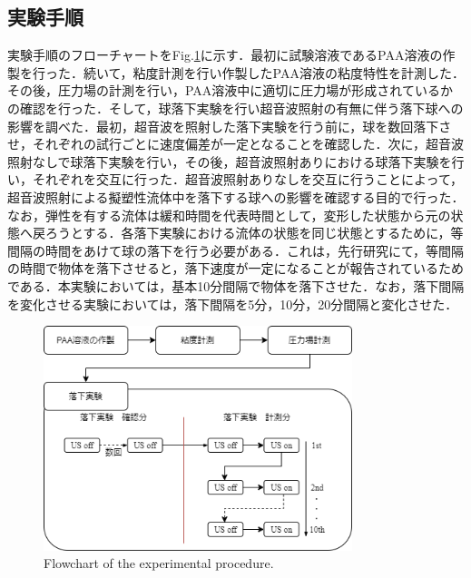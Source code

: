 \newpage

\subsection{実験手順}

実験手順のフローチャートをFig.\ref{fig:exp-methods}に示す．最初に試験溶液であるPAA溶液の作製を行った．続いて，粘度計測を行い作製したPAA溶液の粘度特性を計測した．その後，圧力場の計測を行い，PAA溶液中に適切に圧力場が形成されているかの確認を行った．そして，球落下実験を行い超音波照射の有無に伴う落下球への影響を調べた．最初，超音波を照射した落下実験を行う前に，球を数回落下させ，それぞれの試行ごとに速度偏差が一定となることを確認した．次に，超音波照射なしで球落下実験を行い，その後，超音波照射ありにおける球落下実験を行い，それぞれを交互に行った．超音波照射ありなしを交互に行うことによって，超音波照射による擬塑性流体中を落下する球への影響を確認する目的で行った．なお，弾性を有する流体は緩和時間を代表時間として，変形した状態から元の状態へ戻ろうとする．各落下実験における流体の状態を同じ状態とするために，等間隔の時間をあけて球の落下を行う必要がある．これは，先行研究\cite{ref:8-5}にて，等間隔の時間で物体を落下させると，落下速度が一定になることが報告されているためである．本実験においては，基本10分間隔で物体を落下させた．なお，落下間隔を変化させる実験においては，落下間隔を5分，10分，20分間隔と変化させた．

\begin{figure}[ht]
    \centering
    \includegraphics[clip,width=9.0cm]{2-Methods/exp-methods.png}
    \caption{Flowchart of the experimental procedure.}
    \label{fig:exp-methods}
\end{figure}
